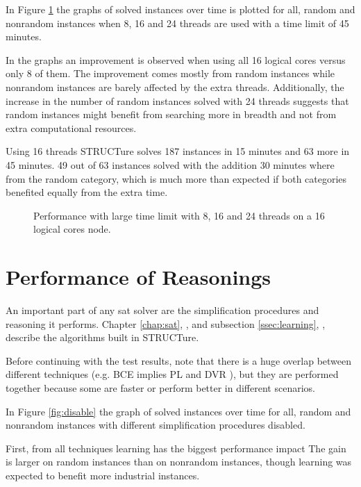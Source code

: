 In Figure \ref{fig:large} the graphs of solved instances over time is
plotted for all, random and nonrandom instances when 8, 16 and 24
threads are used with a time limit of 45 minutes.

In the graphs an improvement is observed when using all 16 logical
cores versus only 8 of them. The improvement comes mostly from
random instances while nonrandom instances are barely affected
by the extra threads.  Additionally, the increase in the number
of random instances solved with 24 threads suggests that random
instances might benefit from searching more in breadth and not from
extra computational resources.

Using 16 threads STRUCTure solves 187 instances in 15 minutes and 63
more in 45 minutes. 49 out of 63 instances solved with the addition
30 minutes where from the random category, which is much more than
expected if both categories benefited equally from the extra time.

\begin{figure}
  \centering
  \caption{Performance with large time limit with 8, 16 and 24
  threads on a 16 logical cores node.}
  \label{fig:large}
\end{figure}


\section{Performance of Reasonings}

An important part of any sat solver are the simplification
procedures and reasoning it performs. Chapter \ref{chap:sat},
, and subsection \ref{ssec:learning},
, describe the algorithms built in STRUCTure.

Before continuing with the test results, note
that there is a huge overlap between different techniques (e.g. BCE
implies PL and DVR \cite{Jarvisalo_blockedclause}), but they are
performed together because some are faster or perform better in
different scenarios.

In Figure \ref{fig:disable} the graph of solved instances over time
for all, random and nonrandom instances with different simplification
procedures disabled.

First, from all techniques learning has the biggest performance
impact The gain is larger on random instances than on nonrandom
instances, though learning was expected to benefit more industrial
instances\cite{DBLP:series/faia/SilvaLM09}.

